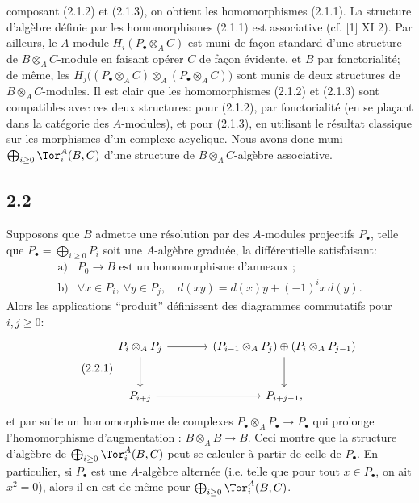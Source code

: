 composant (2.1.2) et (2.1.3), on obtient les homomorphismes (2.1.1). La structure d'algèbre définie par les homomorphismes (2.1.1) est associative (cf. [1] XI 2). Par ailleurs, le \(A\)-module \(H_i(P_\bullet\otimes_A C)\) est muni de façon standard d'une structure de \(B\otimes_A C\)-module en faisant opérer \(C\) de façon évidente, et \(B\) par fonctorialité; de même, les \(H_j\bigl((P_\bullet\otimes_A C)\otimes_A(P_\bullet\otimes_A C)\bigr)\) sont munis de deux structures de \(B\otimes_A C\)-modules. Il est clair que les homomorphismes (2.1.2) et (2.1.3) sont compatibles avec ces deux structures: pour (2.1.2), par fonctorialité (en se plaçant dans la catégorie des \(A\)-modules), et pour (2.1.3), en utilisant le résultat classique sur les morphismes d'un complexe acyclique. Nous avons donc muni \(\bigoplus_{i\ge0}\Tor_i^A(B,C)\) d'une structure de \(B\otimes_A C\)-algèbre associative.

\subsection*{2.2}
Supposons que \(B\) admette une résolution par des \(A\)-modules projectifs \(P_\bullet\), telle que \(P_\bullet=\bigoplus_{i\ge0}P_i\) soit une \(A\)-algèbre graduée, la différentielle satisfaisant:
\[
\begin{array}{ll}
\text{a)}& P_0\longrightarrow B\text{ est un homomorphisme d'anneaux~;}\\[0.4ex]
\text{b)}& \forall x\in P_i,\ \forall y\in P_j,\quad d(xy)=d(x)y+(-1)^i x\,d(y).
\end{array}
\]
Alors les applications ``produit'' définissent des diagrammes commutatifs pour \(i,j\ge0\):
\begin{equation}\tag{2.2.1}
\begin{tikzcd}[column sep=large,row sep=large]
P_i\otimes_A P_j \arrow[r] \arrow[d] & (P_{i-1}\otimes_A P_j)\oplus(P_i\otimes_A P_{j-1}) \arrow[d]\\
P_{i+j} \arrow[r] & P_{i+j-1},
\end{tikzcd}
\end{equation}
et par suite un homomorphisme de complexes \(P_\bullet\otimes_A P_\bullet\to P_\bullet\) qui prolonge l'homomorphisme d'augmentation : \(B\otimes_A B\to B\). Ceci montre que la structure d'algèbre de \(\bigoplus_{i\ge0}\Tor_i^A(B,C)\) peut se calculer à partir de celle de \(P_\bullet\). En particulier, si \(P_\bullet\) est une \(A\)-algèbre alternée (i.e. telle que pour tout \(x\in P_\bullet\), on ait \(x^2=0\)),
alors il en est de même pour \(\bigoplus_{i\ge0}\Tor_i^A(B,C)\).

